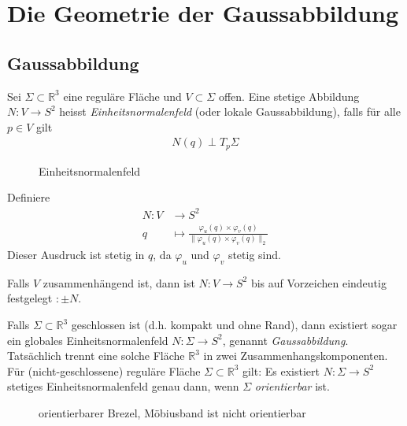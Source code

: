 \documentclass[../main.tex]{subfiles}
\begin{document}
\chapter{Die Geometrie der Gaussabbildung}

\section{Gaussabbildung}



\begin{minipage}{0.7\columnwidth}
    \begin{definition}
        Sei $\Sigma \subset \mathbb{R}^{3}$ eine reguläre Fläche und $V \subset \Sigma$ offen. Eine stetige Abbildung $N:V \to S^2$ heisst \emph{Einheitsnormalenfeld} (oder lokale Gaussabbildung), falls für alle $p \in V$ gilt
        \begin{align*}
            N(q)\perp T_{p}\Sigma
        \end{align*}
    \end{definition}
\end{minipage}
\hspace{0.05\linewidth}
\begin{minipage}{0.3\columnwidth}
    \begin{figure}[H]
        \centering
        \def\svgwidth{\textwidth}
        
        \caption*{Einheitsnormalenfeld}        
    \end{figure}
\end{minipage}

\begin{existence}
    Definiere
    \begin{align*}
        N : V & \to S^{2} \\
        q & \mapsto \frac{\varphi_{u}(q) \times \varphi_{v}(q)}{\lVert \varphi_{u}(q) \times \varphi_{v}(q) \rVert_{2}}
    \end{align*}
    Dieser Ausdruck ist stetig in $q$, da $\varphi_{u}$ und $\varphi_{v}$ stetig sind.
\end{existence}
\begin{uniqueness}
    Falls $V$ zusammenhängend ist, dann ist $N:V \to S^{2}$ bis auf Vorzeichen eindeutig festgelegt $:\pm N$.
\end{uniqueness}
\begin{remark}
    Falls $\Sigma \subset \mathbb{R}^{3}$ geschlossen ist (d.h. kompakt und ohne Rand), dann existiert sogar ein globales Einheitsnormalenfeld $N:\Sigma \to S^{2}$, genannt \emph{Gaussabbildung}.
    Tatsächlich trennt eine solche Fläche $\mathbb{R}^{3}$ in zwei Zusammenhangskomponenten. Für (nicht-geschlossene) reguläre Fläche $\Sigma \subset \mathbb{R}^{3}$ gilt: Es existiert $N:\Sigma \to S^{2}$ stetiges Einheitsnormalenfeld genau dann,
    wenn $\Sigma$ \emph{orientierbar} ist.
\end{remark}
\begin{figure}[H]
    \centering
    \def\svgwidth{\textwidth}
    
    \caption*{orientierbarer Brezel, Möbiusband ist nicht orientierbar}        
\end{figure}
\end{document}
